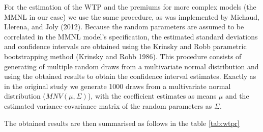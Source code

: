 \documentclass[12pt,]{article}
\begin{document}
For the estimation of the WTP and the premiums for more complex models
(the MMNL in our case) we use the same procedure, as was implemented by
Michaud, Llerena, and Joly (2012). Because the random parameters are
assumed to be correlated in the MMNL model's specification, the
estimated standard deviations and confidence intervals are obtained
using the Krinsky and Robb parametric bootstrapping method (Krinsky and
Robb 1986). This procedure consists of generating of multiple random
draws from a multivariate normal distribution and using the obtained
results to obtain the confidence interval estimates. Exactly as in the
original study we generate 1000 draws from a multivariate normal
distribution (\(MNV(\mu, \Sigma)\)), with the coefficient estimates as
means \(\mu\) and the estimated variance-covariance matrix of the random
parameters as \(\Sigma\).

The obtained results are then summarised as follows in the table
\ref{tab:wtpr}
\end{document}
